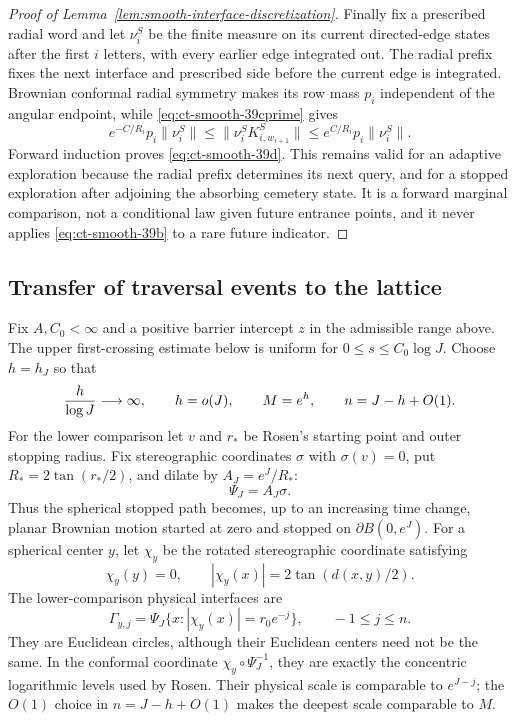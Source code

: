\begin{proof}[Proof of Lemma~\ref{lem:smooth-interface-discretization}]
Finally fix a prescribed radial word and let $\nu_i^S$ be the finite
measure on its current directed-edge states after the first $i$ letters,
with every earlier edge integrated out.  The radial prefix fixes the next
interface and prescribed side before the current edge is integrated.
Brownian conformal radial symmetry makes its row mass $p_i$ independent
of the angular endpoint, while \eqref{eq:ct-smooth-39cprime} gives
\begin{equation}
e^{-C/R_i}p_i\|\nu_i^S\|
 \le\|\nu_i^SK^S_{i,w_{i+1}}\|
 \le e^{C/R_i}p_i\|\nu_i^S\|.\label{eq:ct-smooth-39iprime}
\end{equation}
Forward induction proves \eqref{eq:ct-smooth-39d}.  This remains valid for an adaptive
exploration because the radial prefix determines its next query, and for a
stopped exploration after adjoining the absorbing cemetery state.  It is a
forward marginal comparison, not a conditional law given future entrance
points, and it never applies \eqref{eq:ct-smooth-39b} to a rare future indicator.
\end{proof}

\subsection{Transfer of traversal events to the lattice}

Fix $A,C_0<\infty$ and a positive barrier intercept $z$ in the
admissible range above.  The upper first-crossing estimate below is uniform
for $0\le s\le C_0\log J$.  Choose $h=h_J$ so that
\begin{equation}
{h\over\log J}\longrightarrow\infty,\qquad h=o(J),\qquad
 M=e^h,\qquad n=J-h+O(1).\label{eq:ct-transfer-39}
\end{equation}
For the lower comparison let $v$ and $r_*$ be Rosen's starting
point and outer stopping radius.  Fix stereographic coordinates $\sigma$ with
$\sigma(v)=0$, put $R_*=2\tan(r_*/2)$, and dilate by
$A_J=e^J/R_*$:
\[
\Psi_J=A_J\sigma .
\]
Thus the spherical stopped path becomes, up to an increasing time
change, planar Brownian motion started at zero and stopped on
$\partial B(0,e^J)$.  For a spherical center $y$, let $\chi_y$ be
the rotated stereographic coordinate satisfying
\[
\chi_y(y)=0,\qquad |\chi_y(x)|=2\tan(d(x,y)/2).
\]
The lower-comparison physical interfaces are
\begin{equation}
\Gamma_{y,j}=\Psi_J\{x:|\chi_y(x)|=r_0e^{-j}\},
       \qquad-1\le j\le n.\label{eq:ct-transfer-39g}
\end{equation}
They are Euclidean circles, although their Euclidean centers need not be
the same.  In the conformal coordinate
$\chi_y\circ\Psi_J^{-1}$, they are exactly the concentric logarithmic
levels used by Rosen.  Their physical scale is comparable to
$e^{J-j}$; the $O(1)$ choice in $n=J-h+O(1)$ makes the deepest
scale comparable to $M$.

